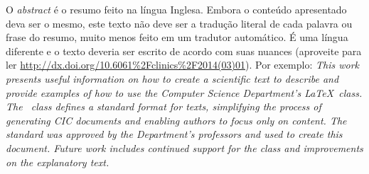 O \emph{abstract} é o resumo feito na língua Inglesa. Embora o conteúdo apresentado
deva ser o mesmo, este texto não deve ser a tradução literal de cada palavra ou
frase do resumo, muito menos feito em um tradutor automático. É uma língua
diferente e o texto deveria ser escrito de acordo com suas nuances (aproveite para ler
\url{http://dx.doi.org/10.6061%2Fclinics%2F2014(03)01}). Por exemplo: \emph{This work presents useful information on how to create a scientific text to describe
and provide examples of how to use the Computer Science Department's \LaTeX\ class. The \unbcic\
class defines a standard format for texts, simplifying the process of generating
CIC documents and enabling authors to focus only on content. The standard was approved
by the Department's professors and used to create this document. Future work includes
continued support for the class and improvements on the explanatory text.}